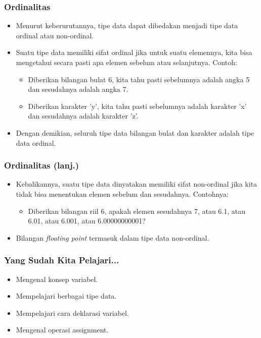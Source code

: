 \begin{frame}
\frametitle{Ordinalitas}
\begin{itemize}
  \item Menurut keberurutannya, tipe data dapat dibedakan menjadi tipe data \alert{ordinal} atau \alert{non-ordinal}.
  \item Suatu tipe data memiliki sifat ordinal jika untuk suatu elemennya, kita bisa mengetahui secara pasti apa elemen sebelum atau selanjutnya. Contoh:
  \begin{itemize}
    \item Diberikan bilangan bulat 6, kita tahu pasti sebelumnya adalah angka 5 dan sesudahnya adalah angka 7.
    \item Diberikan karakter 'y', kita tahu pasti sebelumnya adalah karakter 'x' dan sesudahnya adalah karakter 'z'.
  \end{itemize}
  \item Dengan demikian, seluruh tipe data bilangan bulat dan karakter adalah tipe data ordinal.
\end{itemize}
\end{frame}

\begin{frame}
\frametitle{Ordinalitas (lanj.)}
\begin{itemize}
  \item Kebalikannya, suatu tipe data dinyatakan memiliki sifat non-ordinal jika kita tidak bisa menentukan elemen sebelum dan sesudahnya. Contohnya:
  \begin{itemize}
    \item Diberikan bilangan riil 6, apakah elemen sesudahnya 7, atau 6.1, atau 6.01, atau 6.001, atau 6.00000000001?
  \end{itemize}
  \item Bilangan \textit{floating point} termasuk dalam tipe data non-ordinal.
\end{itemize}
\end{frame}

\begin{frame}
\frametitle{Yang Sudah Kita Pelajari...}
\begin{itemize}
  \item Mengenal konsep variabel.
  \item Mempelajari berbagai tipe data.
  \item Mempelajari cara deklarasi variabel.
  \item Mengenal operasi assignment.
\end{itemize}
\end{frame}



